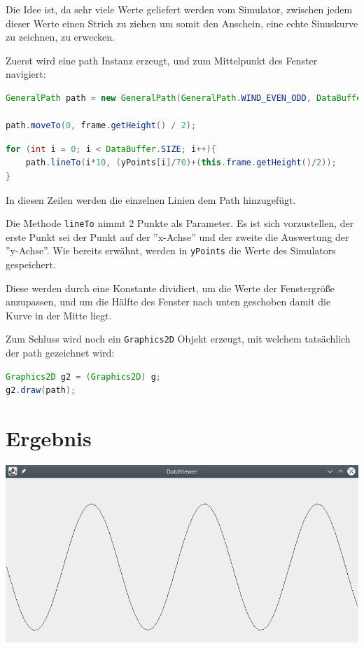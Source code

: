 Die Idee ist, da sehr viele Werte geliefert werden vom Simulator, zwischen jedem dieser Werte einen Strich zu ziehen um somit den Anschein, eine echte Sinuskurve zu zeichnen, zu erwecken.

Zuerst wird eine path Instanz erzeugt, und zum Mittelpunkt des Fenster navigiert:

\begin{lstlisting}[language=Java]
GeneralPath path = new GeneralPath(GeneralPath.WIND_EVEN_ODD, DataBuffer.SIZE);

path.moveTo(0, frame.getHeight() / 2);
\end{lstlisting}

\begin{lstlisting}[language=Java]
for (int i = 0; i < DataBuffer.SIZE; i++){
	path.lineTo(i*10, (yPoints[i]/70)+(this.frame.getHeight()/2));
}
\end{lstlisting}

In diesen Zeilen werden die einzelnen Linien dem Path hinzugefügt.

Die Methode \verb|lineTo| nimmt 2 Punkte als Parameter. Es ist sich vorzustellen, der erste Punkt sei der Punkt auf der ''x-Achse'' und der zweite die Auswertung der ''y-Achse''. Wie bereits erwähnt, werden in \verb|yPoints| die Werte des Simulators gespeichert.

Diese werden durch eine Konstante dividiert, um die Werte der Fenstergröße anzupassen, und um die Hälfte des Fenster nach unten geschoben damit die Kurve in der Mitte liegt.

Zum Schluss wird noch ein \verb|Graphics2D| Objekt erzeugt, mit welchem tatsächlich der path gezeichnet wird:

\begin{lstlisting}[language=Java]
Graphics2D g2 = (Graphics2D) g;
g2.draw(path);
\end{lstlisting}

\section{Ergebnis}
\begin{minipage}{\linewidth}
	\centering
	\includegraphics[width=1\linewidth]{images/ss}
\end{minipage}
